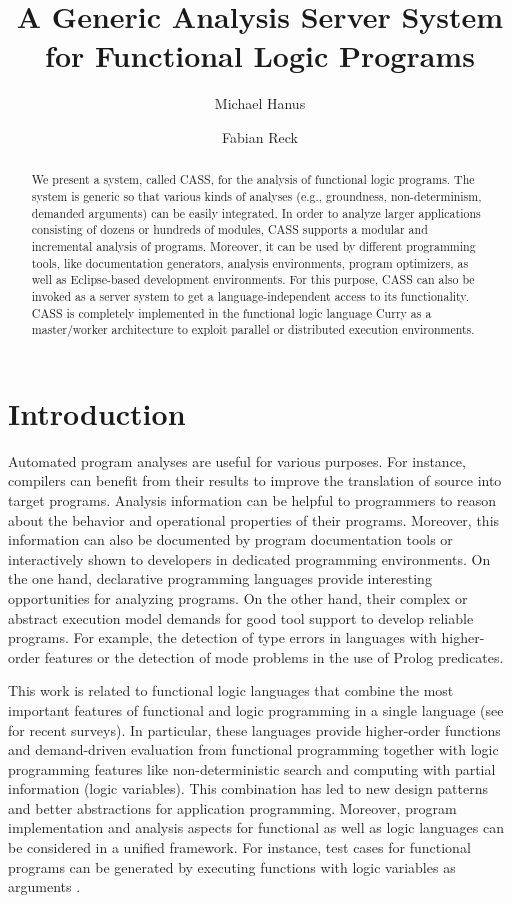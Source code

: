 \documentclass{llncs}
\title{\texorpdfstring
  {A Generic Analysis Server System\\ for Functional Logic Programs}
  {A Generic Analysis Server System for Functional Logic Programs}}
\author{Michael Hanus \and Fabian Reck}
\institute{
Institut f\"ur Informatik, CAU Kiel, D-24098 Kiel, Germany \\
\email{\{mh|fre\}@informatik.uni-kiel.de}
}
\begin{document}
\sloppy
\maketitle

\begin{abstract}
We present a system, called CASS, for the analysis of functional
logic programs.  The system is generic so that various kinds of
analyses (e.g., groundness, non-determinism, demanded arguments) can
be easily integrated.  In order to analyze larger applications
consisting of dozens or hundreds of modules, CASS supports a modular
and incremental analysis of programs.  Moreover, it can be used by
different programming tools, like documentation generators, analysis
environments, program optimizers, as well as Eclipse-based
development environments.  For this purpose, CASS can also be
invoked as a server system to get a language-independent access to
its functionality.  CASS is completely implemented in the functional
logic language Curry as a master/worker architecture to exploit
parallel or distributed execution environments.
\end{abstract}


\section{Introduction}
\label{sec:introduction}

Automated program analyses are useful for various purposes.
For instance, compilers can benefit from their results
to improve the translation of source into target programs.
Analysis information can be helpful to programmers
to reason about the behavior and operational properties
of their programs. Moreover, this information can also be documented
by program documentation tools or interactively shown to developers
in dedicated programming environments.
On the one hand, declarative programming languages provide
interesting opportunities for analyzing programs.
On the other hand, their complex or abstract execution model
demands for good tool support to develop reliable programs.
For example, the detection of type errors in languages with higher-order
features or the detection of mode problems in the use of
Prolog predicates.

This work is related to functional logic languages that
combine the most important
features of functional and logic programming in a single language
(see \cite{AntoyHanus10CACM,Hanus13} for recent surveys).
In particular, these languages provide higher-order functions and demand-driven
evaluation from functional programming together with logic programming features
like non-deterministic search and computing with partial information
(logic variables).
This combination
has led to new design patterns \cite{AntoyHanus02FLOPS,AntoyHanus11WFLP}
and better abstractions for application programming.
Moreover, program implementation and analysis aspects
for functional as well as logic languages can be considered
in a unified framework.
For instance, test cases for functional programs can be generated
by executing functions with logic variables as arguments
\cite{FischerKuchen07}.
\end{document}
